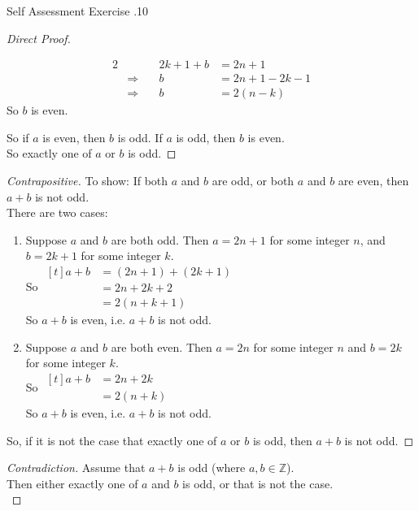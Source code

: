 \documentclass[../notes.tex]{subfiles}
\begin{document}
\begin{exercise}{Self Assessment Exercise \thechapter.10}
\begin{enumerate}
\begin{enumerate}[label=(\alph*)]
\begin{proof}[Direct Proof]
\begin{enumerate}[label=(\roman*)]
\begin{alignat*}{2}
													& & 2k + 1 + b &= 2n + 1\\
													& \Rightarrow \quad &b &= 2n + 1 - 2k - 1\\
													& \Rightarrow \quad &b &= 2(n - k)
												\end{alignat*}
												So $b$ is even.
										\end{enumerate}
										So if $a$ is even, then $b$ is odd. If $a$ is odd, then $b$ is even.\\
										So exactly one of $a$ or $b$ is odd.
									\end{proof}
									\begin{proof}[Contrapositive]
										To show: If both $a$ and $b$ are odd, or both $a$ and $b$ are even, then $a + b$ is not odd.\\
										There are two cases:
										\begin{enumerate}[label=(\roman*)]
											\item Suppose $a$ and $b$ are both odd. Then $a = 2n + 1$ for some integer $n$, and $b = 2k + 1$ for some integer $k$.\\
												So $ \begin{aligned}[t]
													a + b &= (2n + 1) + (2k + 1)\\
													&= 2n + 2k + 2\\
													&= 2(n + k + 1)
												\end{aligned}$\\
												So $a + b$ is even, i.e. $a + b$ is not odd.
											\item Suppose $a$ and $b$ are both even. Then $a = 2n$ for some integer $n$ and $b = 2k$ for some integer $k$.\\
												So $ \begin{aligned}[t]
													a + b &= 2n + 2k\\
													&= 2(n + k)
												\end{aligned}$\\
												So $a + b$ is even, i.e. $a + b$ is not odd.
										\end{enumerate}
										So, if it is not the case that exactly one of $a$ or $b$ is odd, then $a + b$ is not odd.
									\end{proof}
									\pagebreak
									\begin{proof}[Contradiction]
										Assume that $a + b$ is odd (where $a, b \in \mathbb{Z}$).\\
										Then either exactly one of $a$ and $b$ is odd, or that is not the case.\\

\end{proof}
\end{enumerate}
\end{enumerate}
\end{exercise}
\end{document}

